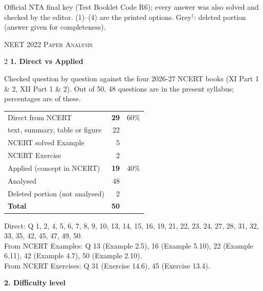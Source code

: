 {\footnotesize Official NTA final key (Test Booklet Code R6); every answer was also solved and checked by the editor. (1)--(4) are the printed options. {\color{gray}Grey$^{\dagger}$}: deleted portion (answer given for completeness).\par
}\par
\clearpage
\begin{center}{}\par
{\fontsize{20}{24}\selectfont\color{navy}\scshape NEET 2022 \textperiodcentered{} Paper Analysis}\par
{\color{gilt}}\end{center}
\vspace{4pt}
\begin{multicols}{2}
\textbf{\color{crimson}1. Direct vs Applied}\par\smallskip
{\footnotesize Checked question by question against the four 2026-27 NCERT books (XI Part 1 \& 2, XII Part 1 \& 2). Out of 50, 48 questions are in the present syllabus; percentages are of these.}\par\smallskip
\begin{tabular}{@{}lrr@{}}\toprule
Direct from NCERT & \textbf{29} & 60\%\\
\quad text, summary, table or figure & 22 &\\
\quad NCERT solved Example & 5 &\\
\quad NCERT Exercise & 2 &\\
Applied (concept in NCERT) & \textbf{19} & 40\%\\\midrule
Analysed & 48 &\\
Deleted portion (not analysed) & 2 &\\\midrule
\textbf{Total} & \textbf{50} &\\\bottomrule\end{tabular}\par\smallskip
{\footnotesize Direct: Q 1, 2, 4, 5, 6, 7, 8, 9, 10, 13, 14, 15, 16, 19, 21, 22, 23, 24, 27, 28, 31, 32, 33, 35, 42, 45, 47, 49, 50.\\ From NCERT Examples: Q 13 (Example 2.5), 16 (Example 5.10), 22 (Example 6.11), 42 (Example 4.7), 50 (Example 2.10).\\ From NCERT Exercises: Q 31 (Exercise 14.6), 45 (Exercise 13.4).}\par\medskip
\textbf{\color{crimson}2. Difficulty level}\par\smallskip
\begin{tabular}{@{}lr@{}}\toprule

\end{tabular}
\end{multicols}
